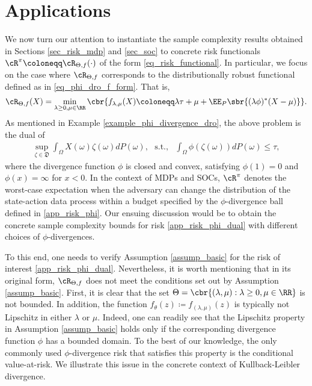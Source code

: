 \documentclass[9pt]{article}
\numberwithin{equation}{section}
\begin{document}
\section{Applications}\label{sec_application}


We now turn our attention to instantiate the  sample complexity results obtained in Sections \ref{sec_risk_mdp} and \ref{sec_soc} to concrete risk functionals $\cR^\pi  \coloneqq  \cR_{\Theta, f}(\cdot)$ of the form \eqref{eq_risk_functional}. 
In particular, we focus on the case where $\cR_{\Theta, f}$ corresponds to the distributionally robust functional defined as in \eqref{eq_phi_dro_f_form}. 
That is,
\begin{align}\label{app_risk_phi_dual}
\cR_{\Theta, f} (X) =  \min_{\lambda \geq 0, \mu \in \RR}
    \cbr{ f_{\lambda, \mu}(X) \coloneqq  \lambda \tau + \mu + 
    \EE_P \sbr{ (\lambda \phi)^* (X - \mu) } } .
\end{align}
As mentioned in Example \ref{example_phi_divergence_dro}, the above problem is the dual of 
\begin{align}\label{app_risk_phi}
 \sup_{\zeta \in \mathfrak{D}} \int_{\Omega} X(\omega) \zeta(\omega) d P(\omega) , ~~~ \mathrm{s.t.}, ~ ~~ \int_{\Omega} \phi(\zeta(\omega)) d P(\omega) \leq \tau,
\end{align}
where the divergence function $\phi$ is closed and convex, satisfying $\phi(1) = 0$ and $\phi(x) = \infty$ for $x < 0$. 
In the context of MDPs and SOCs, 
$\cR^\pi$ denotes the worst-case expectation when the adversary can change the distribution of the state-action data process within a budget specified by the $\phi$-divergence ball defined in \eqref{app_risk_phi}. 
Our ensuing discussion would be to obtain the concrete sample complexity bounds for risk \eqref{app_risk_phi_dual} with different choices of $\phi$-divergences. 

To this end, one needs to verify Assumption \ref{assump_basic} for the risk of interest \eqref{app_risk_phi_dual}.
Nevertheless, it is worth mentioning that in its original form, $\cR_{\Theta, f}$ does not meet the conditions set out by  Assumption \ref{assump_basic}.
First, it is clear that the set $\Theta = \cbr{(\lambda, \mu): \lambda \geq 0, \mu \in \RR}$ is not bounded. 
In addition, the function $f_{\theta} (z) \coloneqq f_{(\lambda, \mu)}(z)$ is typically not Lipschitz in either $\lambda$ or $\mu$. 
Indeed, one can readily see that the Lipschitz property in Assumption \ref{assump_basic} holds only if the corresponding divergence function $\phi$ has a bounded domain. 
To the best of our knowledge, the only commonly used $\phi$-divergence risk that satisfies this property is the conditional value-at-risk.
We illustrate this issue in the concrete context of Kullback-Leibler divergence. 
\end{document}
